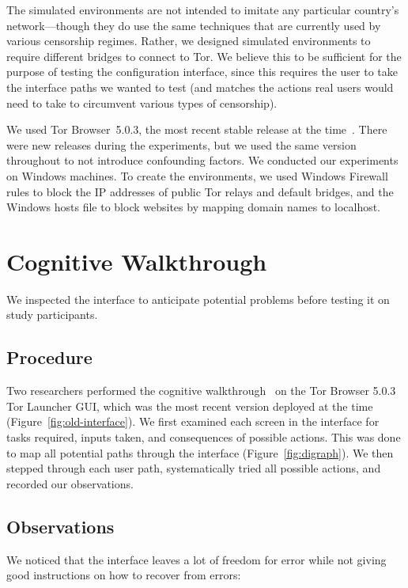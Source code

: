 \documentclass[USenglish,oneside,twocolumn]{article}
\begin{document}
The simulated environments are not intended to imitate any particular country's network---though they do use the same techniques that are currently used by various censorship regimes. Rather, we designed simulated environments to require different bridges to connect to Tor. We believe this to be sufficient for the purpose of testing the configuration interface, since this requires the user to take the interface paths we wanted to test (and matches the actions real users would need to take to circumvent various types of censorship).

We used Tor Browser~5.0.3, the most recent stable release at the time~\cite{torbrowser-503}.
There were new releases during the experiments, but we used the same version throughout to not introduce confounding factors. We conducted our experiments on Windows machines. To create the environments, we used Windows Firewall rules to block the IP addresses of public Tor relays and default bridges, and the Windows hosts file to block websites by mapping domain names to localhost. 


\section{Cognitive Walkthrough}
\label{sec:inspection}
We inspected the interface to anticipate potential problems before testing it on study participants.

\subsection{Procedure} 
Two researchers performed the cognitive walkthrough~\cite{cognitive-walkthrough} on the Tor Browser 5.0.3 Tor Launcher GUI, which was the most recent version deployed at the time (Figure~\ref{fig:old-interface}). We first examined each screen in the interface for tasks required, inputs taken, and consequences of possible actions. This was done to map all potential paths through the interface (Figure~\ref{fig:digraph}). We then stepped through each user path, systematically tried all possible actions, and recorded our observations. 

\subsection{Observations}
We noticed that the interface leaves a lot of freedom for error while not giving good instructions on how to recover from errors: \\
\end{document}
